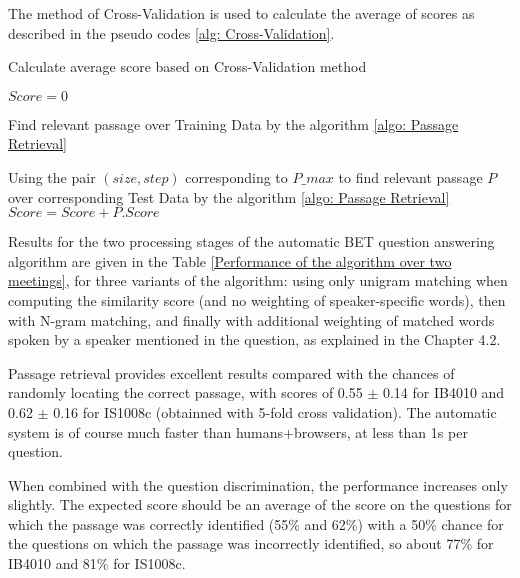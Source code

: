 The method of Cross-Validation is used to calculate the average of scores as described in the pseudo codes \ref{alg: Cross-Validation}.

\begin{algorithm}
\caption{Calculate average score based on Cross-Validation method}
\label{alg: Cross-Validation}
\begin{algorithmic}
\STATE $Score = 0$

\STATE Find relevant passage over Training Data by the algorithm \ref{algo: Passage Retrieval}
			
			
\ENDFOR
\ENDFOR

\STATE 	Using the pair $(size,step)$ corresponding to $P\_max$
\STATE to find relevant passage $P$ over corresponding Test Data by the algorithm \ref{algo: Passage Retrieval}
\STATE $Score = Score + P.Score$
		
\ENDFOR
	

\end{algorithmic}
\end{algorithm}




Results for the two processing stages of the automatic BET question answering algorithm are given in the Table \ref{Performance of the algorithm over two meetings}, for three variants of the algorithm: using only unigram matching when computing the similarity score (and no weighting of speaker-specific words), then with N-gram matching, and finally with additional weighting of matched words spoken by a speaker mentioned in the question, as explained in the Chapter 4.2.

Passage retrieval provides excellent results compared with the chances of randomly locating the correct passage, with scores of 0.55 \ensuremath{\pm} 0.14 for IB4010 and 0.62 \ensuremath{\pm} 0.16 for IS1008c (obtainned with 5-fold cross validation). The automatic system is of course much faster than humans+browsers, at less than 1s per question.

When combined with the question discrimination, the performance increases only slightly. The expected score should be an average of the score on the questions for which the passage was correctly identified (55\% and 62\%) with a 50\%  chance for the questions on which the passage was incorrectly identified, so about 77\% for IB4010 and 81\% for IS1008c. 

